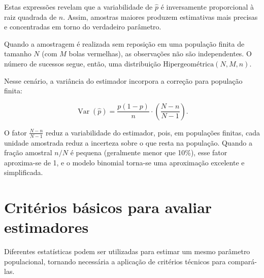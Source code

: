\documentclass[
  letterpaper,
  DIV=11,
  numbers=noendperiod]{scrreprt}
\begin{document}
Estas expressões revelam que a variabilidade de \(\hat{p}\) é
inversamente proporcional à raiz quadrada de \(n\). Assim, amostras
maiores produzem estimativas mais precisas e concentradas em torno do
verdadeiro parâmetro.

\begin{tcolorbox}[enhanced jigsaw, colback=white, leftrule=.75mm, colbacktitle=quarto-callout-note-color!10!white, breakable, titlerule=0mm, bottomtitle=1mm, title=\textcolor{quarto-callout-note-color}{\faInfo}\hspace{0.5em}{Modelo exato para a urna}, colframe=quarto-callout-note-color-frame, toprule=.15mm, opacityback=0, bottomrule=.15mm, opacitybacktitle=0.6, arc=.35mm, toptitle=1mm, rightrule=.15mm, coltitle=black, left=2mm]

Quando a amostragem é realizada sem reposição em uma população finita de
tamanho \(N\) (com \(M\) bolas vermelhas), as observações não são
independentes. O número de sucessos segue, então, uma distribuição
\(\text{Hipergeométrica} (N,M,n)\).

Nesse cenário, a variância do estimador incorpora a correção para
população finita:

\[\operatorname{Var}(\widehat{p})=\frac{p(1-p)}{n} \cdot \left(\frac{N-n}{N-1}\right).\]

O fator \(\frac{N-n}{N-1}\) reduz a variabilidade do estimador, pois, em
populações finitas, cada unidade amostrada reduz a incerteza sobre o que
resta na população. Quando a fração amostral \(n/N\) é pequena
(geralmente menor que 10\%), esse fator aproxima-se de 1, e o modelo
binomial torna-se uma aproximação excelente e simplificada.

\end{tcolorbox}

\section{Critérios básicos para avaliar
estimadores}\label{crituxe9rios-buxe1sicos-para-avaliar-estimadores}

Diferentes estatísticas podem ser utilizadas para estimar um mesmo
parâmetro populacional, tornando necessária a aplicação de critérios
técnicos para compará-las.
\end{document}
